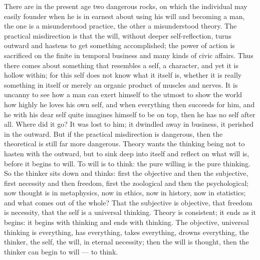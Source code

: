 \documentclass[12pt,a4paper,openany]{book}
\newcommand{\opage}[1]{\marginnote{\footnotesize\textit{[#1]}}}
\begin{document}
There are in the present age two dangerous rocks, on which the individual
may easily founder when he is in earnest about
using his will and becoming a man, the one is a
misunderstood practice, the other a misunderstood theory.
The practical misdirection is that the will, without deeper self-reflection,
turns outward and hastens to get something
\setcounter{footnote}{0}%
\opage{498}accomplished; the power of action is sacrificed on the finite in temporal
business and many kinds of civic affairs. Thus
there comes about something that resembles a self, a character,
and yet it is hollow within; for this self does not know
what it itself is, whether it is really something in itself or
merely an organic product of muscles and nerves. It is
uncanny to see how a man can exert
himself to the utmost to show the world how highly he
loves his own self, and when everything then succeeds for him, and
he with his dear self quite imagines himself to be on top,
then he has no self after all. Where did it go? It
was lost to him; it dwindled away in business, it
perished in the outward. But if the practical misdirection is
dangerous, then the theoretical is still far more dangerous.
Theory wants the thinking being not to hasten
with the outward, but to sink deep into itself and reflect
on what will is, before it begins to will.
To will is to think: the pure willing is the pure thinking.
So the thinker sits down and thinks: first the
objective and then the subjective, first necessity and
then freedom, first the zoological and then the psychological;
now thought is in metaphysics, now in ethics, now in history,
now in statistics; and what comes out of the
whole? That the subjective is objective, that freedom is necessity,
that the self is a universal thinking. Theory
is consistent; it ends as it begins: it begins
with thinking and ends with thinking. The objective,
universal thinking is everything, has everything, takes everything, drowns
everything, the thinker, the self, the will, in eternal necessity;
then the will is thought, then the thinker can begin to will
--- to think.
\end{document}
